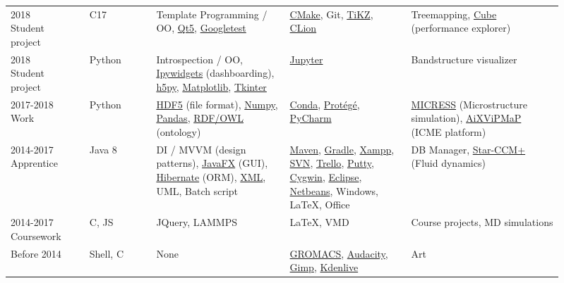 \documentclass[11pt,a4paper]{moderncv}
\def\SymboCpp{C\raisebox{0.5ex}{\tiny\textbf{++}}}
\begin{document}
\begin{center}
{\begin{tabular}{p{0.13\linewidth} p{0.11\linewidth} >{\raggedright\arraybackslash}p{0.22\linewidth} >{\raggedright\arraybackslash}p{0.2\linewidth} >{\raggedright\arraybackslash}p{0.25\linewidth}}
      \makecell[l]{2018 \\ Student \\ project} & \SymboCpp{}17 & Template Programming / OO, \href{https://www.qt.io/}{Qt5}, \href{https://github.com/google/googletest}{Googletest} & \href{https://cmake.org/}{CMake}, Git, \href{https://texample.net/tikz/}{TiKZ}, \href{https://www.jetbrains.com/clion/}{CLion} & Treemapping, \href{https://www.scalasca.org/software/cube-4.x/}{Cube} (performance explorer)\\
      \makecell[l]{2018 \\Student \\ project} & Python & Introspection / OO, \href{https://github.com/jupyter-widgets/ipywidgets}{Ipywidgets} (dashboarding), \href{https://www.h5py.org/}{h5py}, \href{https://matplotlib.org/}{Matplotlib}, \href{https://docs.python.org/3/library/tk.html}{Tkinter} & \href{https://jupyter.org/}{Jupyter} & Bandstructure visualizer\\
      2017-2018 Work & Python & \href{https://www.hdfgroup.org/solutions/hdf5/}{HDF5} (file format), \href{https://numpy.org}{Numpy}, \href{https://pandas.pydata.org/}{Pandas}, \href{https://www.w3.org/OWL/}{RDF/OWL} (ontology) & \href{https://anaconda.org/conda-forge/}{Conda}, \href{https://protege.stanford.edu/}{Protégé}, \href{https://www.jetbrains.com/pycharm/}{PyCharm} & \href{https://micress.rwth-aachen.de/}{MICRESS} (Microstructure simulation), \href{aixvipmap.de}{AiXViPMaP} (ICME platform)\\
      2014-2017 Apprentice & Java 8 & DI / MVVM (design patterns), \href{https://openjfx.io/}{JavaFX} (GUI), \href{https://hibernate.org/}{Hibernate} (ORM), \href{https://www.w3.org/TR/xml/}{XML}, UML, Batch script & \href{https://maven.apache.org/}{Maven}, \href{https://gradle.org/}{Gradle}, \href{https://www.apachefriends.org/index.html}{Xampp}, \href{https://subversion.apache.org/}{SVN}, \href{https://trello.com/}{Trello}, \href{https://www.putty.org/}{Putty}, \href{https://cygwin.com/}{Cygwin}, \href{https://www.eclipse.org/}{Eclipse}, \href{https://netbeans.apache.org//}{Netbeans}, Windows, \LaTeX{}, Office & DB Manager, \href{https://www.plm.automation.siemens.com/global/en/products/simcenter/STAR-CCM.html}{Star-CCM+} (Fluid dynamics)\\
      2014-2017 Coursework & \SymboCpp{}, JS & JQuery, LAMMPS & \LaTeX{}, VMD & Course projects, MD simulations\\
      Before 2014 & Shell, \SymboCpp{} & None & \href{https://www.gromacs.org/}{GROMACS}, \href{https://www.audacityteam.org/}{Audacity}, \href{https://www.gimp.org}{Gimp}, \href{https://kdenlive.org}{Kdenlive} & Art\\
    \end{tabular}
  }
\end{center}
\end{document}
